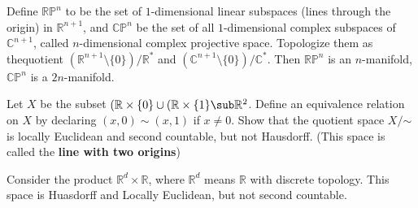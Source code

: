 \begin{example}
Define $\mathbb{RP}^n$ to be the set of $1$-dimensional linear subspaces (lines through the origin) in $\mathbb{R}^{n+1}$, and $\mathbb{CP}^n$ be the set of all $1$-dimensional complex subspaces of $\mathbb{C}^{n+1}$, called $n$-dimensional complex projective space. Topologize them as thequotient $(\mathbb{R}^{n+1}\setminus\{0\})/\mathbb{R}^*$ and $(\mathbb{C}^{n+1}\setminus\{0\})/\mathbb{C}^*$. Then $\mathbb{RP}^n$ is an $n$-manifold, $\mathbb{CP}^{n}$ is a $2n$-manifold.
\end{example}
\begin{example}
Let $X$ be the subset $(\mathbb{R}\times\{0\}\cup(\mathbb{R}\times\{1\}\sub\mathbb{R}^2$. Define an equivalence relation on $X$ by declaring $(x,0)\sim(x,1)$ if $x\neq 0$. Show that the quotient space
$X/$$\sim$ is locally Euclidean and second countable, but not Hausdorff. (This space is called the \textbf{line with two origins})
\end{example}
\begin{example}
Consider the product $\mathbb{R}^d\times\mathbb{R}$, where $\mathbb{R}^d$ means $\mathbb{R}$ with discrete topology. This space is Huasdorff and Locally Euclidean, but not second countable.
\end{example}
